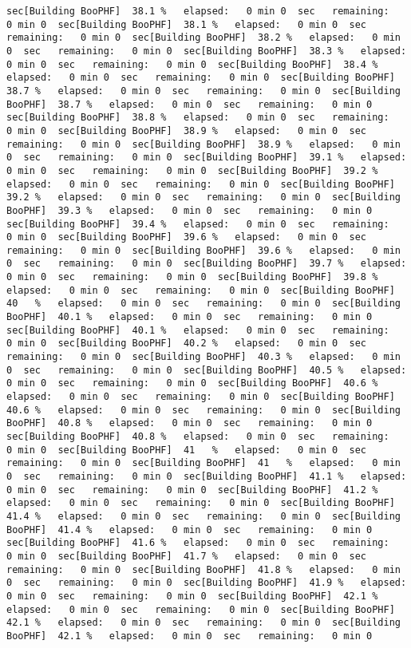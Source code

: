 \documentclass[
]{book}
\begin{document}
\begin{verbatim}
sec[Building BooPHF]  38.1 %   elapsed:   0 min 0  sec   remaining:   0 min 0  sec[Building BooPHF]  38.1 %   elapsed:   0 min 0  sec   remaining:   0 min 0  sec[Building BooPHF]  38.2 %   elapsed:   0 min 0  sec   remaining:   0 min 0  sec[Building BooPHF]  38.3 %   elapsed:   0 min 0  sec   remaining:   0 min 0  sec[Building BooPHF]  38.4 %   elapsed:   0 min 0  sec   remaining:   0 min 0  sec[Building BooPHF]  38.7 %   elapsed:   0 min 0  sec   remaining:   0 min 0  sec[Building BooPHF]  38.7 %   elapsed:   0 min 0  sec   remaining:   0 min 0  sec[Building BooPHF]  38.8 %   elapsed:   0 min 0  sec   remaining:   0 min 0  sec[Building BooPHF]  38.9 %   elapsed:   0 min 0  sec   remaining:   0 min 0  sec[Building BooPHF]  38.9 %   elapsed:   0 min 0  sec   remaining:   0 min 0  sec[Building BooPHF]  39.1 %   elapsed:   0 min 0  sec   remaining:   0 min 0  sec[Building BooPHF]  39.2 %   elapsed:   0 min 0  sec   remaining:   0 min 0  sec[Building BooPHF]  39.2 %   elapsed:   0 min 0  sec   remaining:   0 min 0  sec[Building BooPHF]  39.3 %   elapsed:   0 min 0  sec   remaining:   0 min 0  sec[Building BooPHF]  39.4 %   elapsed:   0 min 0  sec   remaining:   0 min 0  sec[Building BooPHF]  39.6 %   elapsed:   0 min 0  sec   remaining:   0 min 0  sec[Building BooPHF]  39.6 %   elapsed:   0 min 0  sec   remaining:   0 min 0  sec[Building BooPHF]  39.7 %   elapsed:   0 min 0  sec   remaining:   0 min 0  sec[Building BooPHF]  39.8 %   elapsed:   0 min 0  sec   remaining:   0 min 0  sec[Building BooPHF]  40   %   elapsed:   0 min 0  sec   remaining:   0 min 0  sec[Building BooPHF]  40.1 %   elapsed:   0 min 0  sec   remaining:   0 min 0  sec[Building BooPHF]  40.1 %   elapsed:   0 min 0  sec   remaining:   0 min 0  sec[Building BooPHF]  40.2 %   elapsed:   0 min 0  sec   remaining:   0 min 0  sec[Building BooPHF]  40.3 %   elapsed:   0 min 0  sec   remaining:   0 min 0  sec[Building BooPHF]  40.5 %   elapsed:   0 min 0  sec   remaining:   0 min 0  sec[Building BooPHF]  40.6 %   elapsed:   0 min 0  sec   remaining:   0 min 0  sec[Building BooPHF]  40.6 %   elapsed:   0 min 0  sec   remaining:   0 min 0  sec[Building BooPHF]  40.8 %   elapsed:   0 min 0  sec   remaining:   0 min 0  sec[Building BooPHF]  40.8 %   elapsed:   0 min 0  sec   remaining:   0 min 0  sec[Building BooPHF]  41   %   elapsed:   0 min 0  sec   remaining:   0 min 0  sec[Building BooPHF]  41   %   elapsed:   0 min 0  sec   remaining:   0 min 0  sec[Building BooPHF]  41.1 %   elapsed:   0 min 0  sec   remaining:   0 min 0  sec[Building BooPHF]  41.2 %   elapsed:   0 min 0  sec   remaining:   0 min 0  sec[Building BooPHF]  41.4 %   elapsed:   0 min 0  sec   remaining:   0 min 0  sec[Building BooPHF]  41.4 %   elapsed:   0 min 0  sec   remaining:   0 min 0  sec[Building BooPHF]  41.6 %   elapsed:   0 min 0  sec   remaining:   0 min 0  sec[Building BooPHF]  41.7 %   elapsed:   0 min 0  sec   remaining:   0 min 0  sec[Building BooPHF]  41.8 %   elapsed:   0 min 0  sec   remaining:   0 min 0  sec[Building BooPHF]  41.9 %   elapsed:   0 min 0  sec   remaining:   0 min 0  sec[Building BooPHF]  42.1 %   elapsed:   0 min 0  sec   remaining:   0 min 0  sec[Building BooPHF]  42.1 %   elapsed:   0 min 0  sec   remaining:   0 min 0  sec[Building BooPHF]  42.1 %   elapsed:   0 min 0  sec   remaining:   0 min 0  
\end{verbatim}
\end{document}
